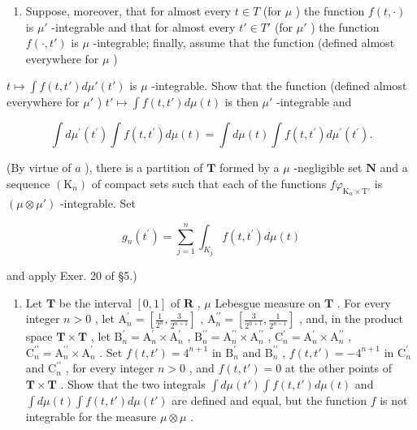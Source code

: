 \begin{enumerate}
\def\labelenumi{\alph{enumi})}
\setcounter{enumi}{1}
\tightlist
\item
  Suppose, moreover, that for almost every \(t \in T\) (for \(\mu\) ) the function \(f(t, \cdot)\) is \(\mu'\) -integrable and that for almost every \(t' \in T'\) (for \(\mu'\) ) the function \(f(\cdot, t')\) is \(\mu\) -integrable; finally, assume that the function (defined almost everywhere for \(\mu\) )
\end{enumerate}

\(t \mapsto \int f(t, t') d\mu'(t')\) is \(\mu\) -integrable. Show that the function (defined almost everywhere for \(\mu'\) ) \(t' \mapsto \int f(t, t') d\mu(t)\) is then \(\mu'\) -integrable and

\[
\int d \mu^ {\prime} (t ^ {\prime}) \int f (t, t ^ {\prime}) d \mu (t) = \int d \mu (t) \int f (t, t ^ {\prime}) d \mu^ {\prime} (t ^ {\prime}).
\]

(By virtue of \(a\) ), there is a partition of \(\mathbf{T}\) formed by a \(\mu\) -negligible set \(\mathbf{N}\) and a sequence \((\mathrm{K}_n)\) of compact sets such that each of the functions \(f\varphi_{\mathrm{K}_n\times \mathrm{T}'}\) is \((\mu \otimes \mu')\) -integrable. Set

\[
g _ {n} (t ^ {\prime}) = \sum_ {j = 1} ^ {n} \int_ {K _ {j}} f (t, t ^ {\prime}) d \mu (t)
\]

and apply Exer. 20 of §5.)

\begin{enumerate}
\def\labelenumi{\alph{enumi})}
\setcounter{enumi}{2}
\tightlist
\item
  Let \(\mathbf{T}\) be the interval \([0,1]\) of \(\mathbf{R}\) , \(\mu\) Lebesgue measure on \(\mathbf{T}\) . For every integer \(n > 0\) , let \(\mathrm{A}_n^\prime = \left[\frac{1}{2^n}, \frac{3}{2^{n+1}}\right]\) , \(\mathrm{A}_n^{\prime\prime} = \left[\frac{3}{2^{n+1}}, \frac{1}{2^{n-1}}\right]\) , and, in the product space \(\mathbf{T} \times \mathbf{T}\) , let \(\mathrm{B}_n^\prime = \mathrm{A}_n^\prime \times \mathrm{A}_n^\prime\) , \(\mathrm{B}_n^{\prime\prime} = \mathrm{A}_n^{\prime\prime} \times \mathrm{A}_n^{\prime\prime}\) , \(\mathrm{C}_n^\prime = \mathrm{A}_n^\prime \times \mathrm{A}_n^{\prime\prime}\) , \(\mathrm{C}_n^{\prime\prime} = \mathrm{A}_n^{\prime\prime} \times \mathrm{A}_n^\prime\) . Set \(f(t,t') = 4^{n+1}\) in \(\mathrm{B}_n^\prime\) and \(\mathrm{B}_n^{\prime\prime}\) , \(f(t,t') = -4^{n+1}\) in \(\mathrm{C}_n^\prime\) and \(\mathrm{C}_n^{\prime\prime}\) , for every integer \(n > 0\) , and \(f(t,t') = 0\) at the other points of \(\mathbf{T} \times \mathbf{T}\) . Show that the two integrals \(\int d\mu(t') \int f(t,t') d\mu(t)\) and \(\int d\mu(t) \int f(t,t') d\mu(t')\) are defined and equal, but the function \(f\) is not integrable for the measure \(\mu \otimes \mu\) .
\end{enumerate}

